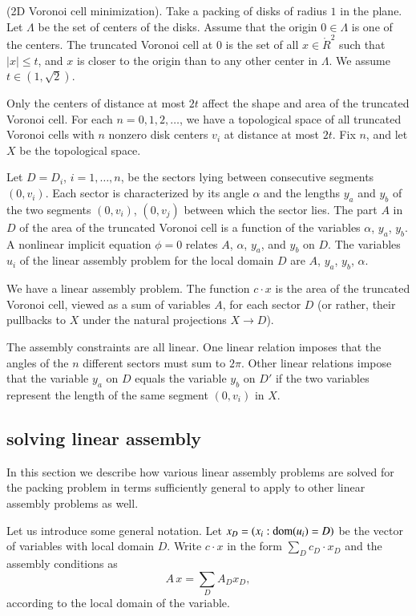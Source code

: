 \begin{example} (2D Voronoi cell minimization). Take a packing of disks of
radius $1$ in the plane.  Let $\Lambda$ be the set of centers of
the disks.  Assume that the origin $0\in\Lambda$ is one of the
centers. The truncated Voronoi cell at $0$ is the set of all
$x\in\ring{R}^2$ such that $|x|\le t$, and $x$ is closer to the
origin than to any other center in $\Lambda$.  We assume
$t\in(1,\sqrt2)$.

Only the centers of distance at most $2t$ affect the shape and
area of the truncated Voronoi cell.  For each $n=0,1,2,\ldots$, we
have a topological space of all truncated Voronoi cells with $n$
nonzero disk centers $v_i$ at distance at most $2t$.  Fix $n$, and
let $X$ be the topological space.

Let $D=D_i$, $i=1,\ldots,n$,  be the sectors lying between
consecutive segments $(0,v_i)$.  Each sector is characterized by
its angle $\alpha$ and the lengths $y_a$ and $y_b$ of the two
segments $(0,v_i)$, $(0,v_j)$ between which the sector lies.  The
part $A$ in $D$ of the area of the truncated Voronoi cell is a
function of the variables $\alpha$, $y_a$, $y_b$.  A nonlinear
implicit equation $\phi=0$ relates $A$, $\alpha$, $y_a$, and $y_b$
on $D$. The variables $u_i$ of the linear assembly problem for the
local domain $D$ are $A$, $y_a$, $y_b$, $\alpha$.


We have a linear assembly problem.  The function $c\cdot x$ is the
area of the truncated Voronoi cell, viewed as a sum of variables
$A$, for each sector $D$ (or rather, their pullbacks to $X$ under
the natural projections $X\to D$).

The assembly constraints are all linear. One linear relation
imposes that the angles of the $n$ different sectors must sum to
$2\pi$. Other linear relations impose that the variable $y_a$ on
$D$ equals the variable $y_b$ on $D'$ if the two variables
represent the length of the same segment $(0,v_i)$ in $X$.
\end{example}


\subsection{solving linear assembly}

In this section we describe how various linear assembly problems
are solved for the packing problem in terms
sufficiently general to apply to other linear assembly problems as
well.

Let us introduce some general notation.  Let $x_D = (x_i:
{\operatorname{dom}}(u_i)=D)$ be the vector of variables with local domain
$D$. Write $c\cdot x$ in the form $\sum_D c_D\cdot x_D$ and the
assembly conditions as
$$A \,x =\sum_D A_D x_D,$$
according to the local domain of the variable.


